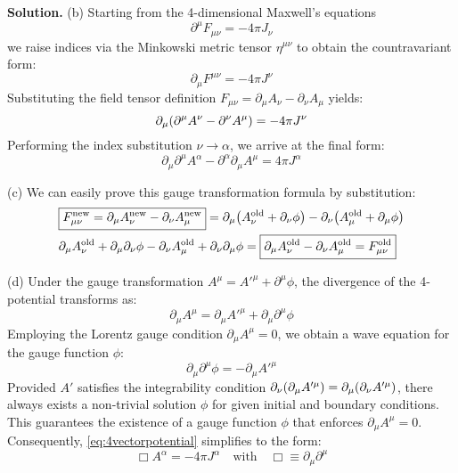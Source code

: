 \documentclass[12pt, a4paper, oneside]{article}
\newenvironment{solution}{\par\noindent\textbf{Solution. }}{\par}
\newcommand{\p}{\partial}
\begin{document}
\begin{solution}
    (b) Starting from the 4-dimensional Maxwell's equations
    \begin{equation*}
        \p^\mu F_{\mu\nu}=-4\pi J_\nu
    \end{equation*}
    we raise indices via the Minkowski metric tensor $\eta^{\mu\nu}$ to obtain the countravariant form:
    \begin{equation*}
        \p_\mu F^{\mu\nu}=-4\pi J^\nu
    \end{equation*}
    Substituting the field tensor definition $F_{\mu\nu}=\p_\mu A_\nu - \p_\nu A_\mu$ yields:
    \begin{equation*}
        \p_\mu\qty(\p^\mu A^\nu - \p^\nu A^\mu)=-4\pi J^\nu
    \end{equation*}
    Performing the index substitution $\nu\to\alpha$, we arrive at the final form:
    \begin{equation}
        \boxed{
            \p_\mu\p^\mu A^\alpha - \p^\alpha\p_\mu A^\mu = 4\pi J^\alpha
        }\label{eq:4vectorpotential}
    \end{equation}

    (c) We can easily prove this gauge transformation formula by substitution:
    \begin{equation}
        \begin{split}
            &\boxed{F^{\text{new}}_{\mu\nu}=\p_\mu A^\text{new}_\nu - \p_\nu A^\text{new}_\mu} = \p_\mu \qty(A^\text{old}_\nu+\p_\nu \phi) - \p_\nu \qty(A^\text{old}_\mu+\p_\mu \phi)\\
            &\p_\mu A^\text{old}_\nu+\p_\mu\p_\nu \phi - \p_\nu A^\text{old}_\mu+\p_\nu\p_\mu \phi = \boxed{\p_\mu A^\text{old}_\nu - \p_\nu A^\text{old}_\mu = F^\text{old}_{\mu\nu}}
        \end{split}
    \end{equation}

    (d) Under the gauge transformation $A^\mu = A'^\mu + \p^\mu \phi$, the divergence of the 4-potential transforms as:
    \begin{equation*}
        \p_\mu A^\mu = \p_\mu A'^\mu + \p_\mu \p^\mu \phi
    \end{equation*}
    Employing the Lorentz gauge condition $\p_\mu A^\mu = 0$, we obtain a wave equation for the gauge function $\phi$:
    \begin{equation*}
        \p_\mu \p^\mu \phi = -\p_\mu A'^\mu
    \end{equation*}
    Provided $A'$ satisfies the integrability condition $\p_\nu\qty(\p_\mu A'^\mu)=\p_\mu\qty(\p_\nu A'^\mu)$, there always exists a non-trivial solution $\phi$ for given initial and boundary conditions. This guarantees the existence of a gauge function $\phi$ that enforces $\p_\mu A^\mu=0$. Consequently, \cref{eq:4vectorpotential} simplifies to the form:
    \begin{equation}
        \boxed{
            \Box A^\alpha = -4\pi J^\alpha \quad \text{with}\quad \Box \equiv \p_\mu \p^\mu
        }
    \end{equation}
\end{solution}
\end{document}
